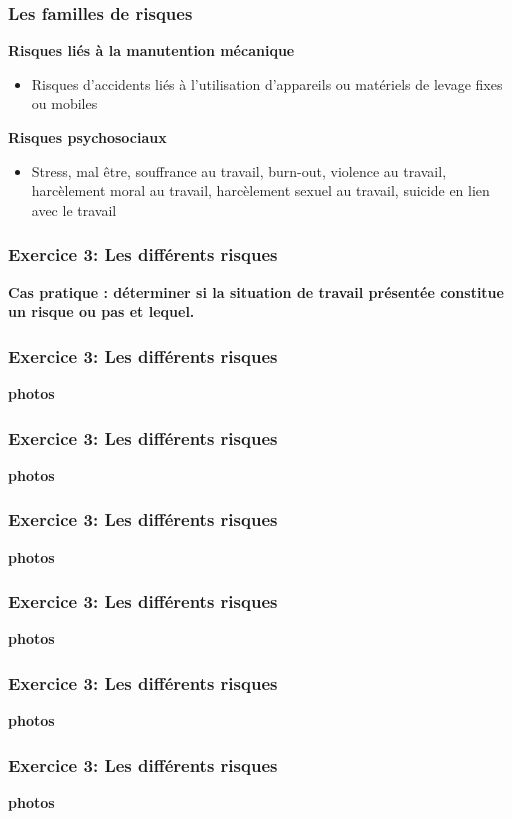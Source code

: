 \documentclass{beamer}
\begin{document}
\begin{frame}
\frametitle{Les familles de risques}
\textbf{Risques liés à la manutention mécanique}
\begin{itemize}
\item Risques d’accidents liés à l’utilisation d’appareils ou matériels de levage fixes ou mobiles
\end{itemize}
\textbf{Risques psychosociaux}
\begin{itemize}
\item Stress, mal être, souffrance au travail, burn-out, violence au travail, harcèlement moral au travail, harcèlement sexuel au travail, suicide en lien avec le travail
\end{itemize}
\end{frame}

\begin{frame}
\frametitle{Exercice 3: Les différents risques}
\textbf{Cas pratique : déterminer si la situation de travail présentée constitue un risque ou pas et lequel.} 
\end{frame}

\begin{frame}
\frametitle{Exercice 3: Les différents risques}
\textbf{photos}
\end{frame}

\begin{frame}
\frametitle{Exercice 3: Les différents risques}
\textbf{photos}
\end{frame}

\begin{frame}
\frametitle{Exercice 3: Les différents risques}
\textbf{photos}
\end{frame}

\begin{frame}
\frametitle{Exercice 3: Les différents risques}
\textbf{photos}
\end{frame}

\begin{frame}
\frametitle{Exercice 3: Les différents risques}
\textbf{photos}
\end{frame}

\begin{frame}
\frametitle{Exercice 3: Les différents risques}
\textbf{photos}
\end{frame}
\end{document}
